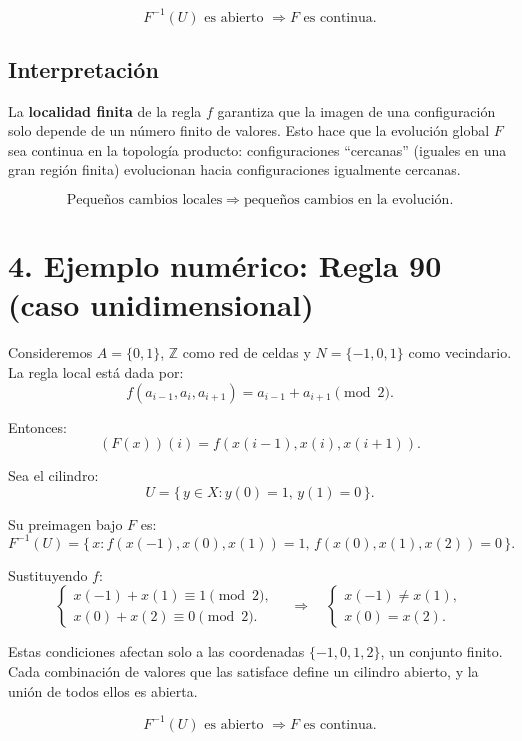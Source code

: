\documentclass[12pt]{article}
\begin{document}
\[
\boxed{F^{-1}(U) \text{ es abierto } \Rightarrow F \text{ es continua.}}
\]

\subsection*{Interpretación}

La \textbf{localidad finita} de la regla $f$ garantiza que la imagen de una configuración solo depende de un número finito de valores.  
Esto hace que la evolución global $F$ sea continua en la topología producto: configuraciones ``cercanas'' (iguales en una gran región finita) evolucionan hacia configuraciones igualmente cercanas.

\[
\text{Pequeños cambios locales} \;\Rightarrow\; \text{pequeños cambios en la evolución.}
\]

\bigskip

\section*{4. Ejemplo numérico: Regla 90 (caso unidimensional)}

Consideremos $A=\{0,1\}$, $\mathbb{Z}$ como red de celdas y $N=\{-1,0,1\}$ como vecindario.  
La regla local está dada por:
\[
f(a_{i-1}, a_i, a_{i+1}) = a_{i-1} + a_{i+1} \pmod 2.
\]

Entonces:
\[
(F(x))(i) = f(x(i-1), x(i), x(i+1)).
\]

Sea el cilindro:
\[
U = \{\, y \in X : y(0)=1,\, y(1)=0 \,\}.
\]

Su preimagen bajo $F$ es:
\[
F^{-1}(U)
= \{\, x : f(x(-1),x(0),x(1))=1, \, f(x(0),x(1),x(2))=0 \,\}.
\]

Sustituyendo $f$:
\[
\begin{cases}
x(-1) + x(1) \equiv 1 \pmod 2,\\[3pt]
x(0) + x(2) \equiv 0 \pmod 2.
\end{cases}
\quad \Rightarrow \quad
\begin{cases}
x(-1)\neq x(1),\\
x(0)=x(2).
\end{cases}
\]

Estas condiciones afectan solo a las coordenadas $\{-1,0,1,2\}$, un conjunto finito.  
Cada combinación de valores que las satisface define un cilindro abierto, y la unión de todos ellos es abierta.

\[
\boxed{F^{-1}(U) \text{ es abierto } \Rightarrow F \text{ es continua.}}
\]

\bigskip
\end{document}
